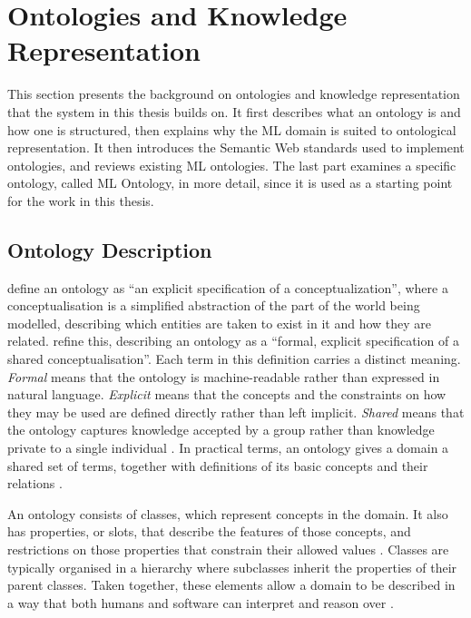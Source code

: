 \section{Ontologies and Knowledge Representation}
\label{sec:ontologies-and-knowledge-representation}

This section presents the background on ontologies and knowledge
representation that the system in this thesis builds on. It first
describes what an ontology is and how one is structured, then
explains why the ML domain is suited to ontological
representation. It then introduces the Semantic Web standards used
to implement ontologies, and reviews existing ML ontologies. The
last part examines a specific ontology, called ML Ontology, in more detail, since it is used as
a starting point for the work in this thesis.

\subsection{Ontology Description}
\label{sec:ontology-description}

\textcite[1]{gruber1995toward_principles_design_ontologies_used_knowledge_sharing}
define an ontology as
\enquote{an explicit specification of a conceptualization},
where a conceptualisation is a simplified abstraction of the part of the
world being modelled, describing which entities are taken to exist in it
and how they are related.
\textcite[184]{studer1998knowledge_engineering_principles_methods} refine
this, describing an ontology as a
\enquote{formal, explicit specification of a shared conceptualisation}.
Each term in this definition carries a distinct meaning.
\textit{Formal} means that the ontology is machine-readable rather than
expressed in natural language.
\textit{Explicit} means that the concepts and the constraints on how
they may be used are defined directly rather than left implicit.
\textit{Shared} means that the ontology captures knowledge accepted by a
group rather than knowledge private to a single individual
\parencite{studer1998knowledge_engineering_principles_methods}.
In practical terms, an ontology gives a domain a shared set of terms,
together with definitions of its basic concepts and their relations
\parencite{noy2001ontology_development_101_guide_creating_first_ontology}.

An ontology consists of classes, which represent concepts in the
domain. It also has properties, or slots, that describe the features
of those concepts, and restrictions on those properties that
constrain their allowed values
\parencite{noy2001ontology_development_101_guide_creating_first_ontology}.
Classes are typically organised in a hierarchy where subclasses
inherit the properties of their parent classes. Taken together, these
elements allow a domain to be described in a way that both humans and
software can interpret and reason over
\parencite{noy2001ontology_development_101_guide_creating_first_ontology}.

